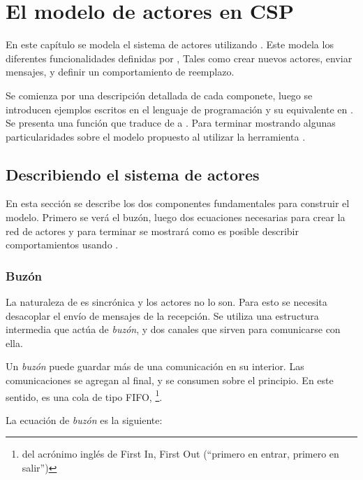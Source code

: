 \chapter{El modelo de actores en CSP}
En este capítulo se modela el sistema de actores utilizando \CSP. Este modela los diferentes funcionalidades definidas por \SAL, Tales como crear nuevos actores, enviar mensajes, y definir un comportamiento de reemplazo. 

Se comienza por una descripción detallada de cada componete, luego se introducen ejemplos escritos en el lenguaje de programación \SAL y su equivalente en \CSP. Se presenta una función que traduce de \SAL a \CSP. Para terminar mostrando algunas particularidades sobre el modelo propuesto al utilizar la herramienta \FDR.

\section{Describiendo el sistema de actores} 
En esta sección se describe los dos componentes fundamentales para construir el modelo. Primero se verá el buzón, luego dos ecuaciones necesarias para crear la red de actores y para terminar se mostrará como es posible describir comportamientos usando \CSP. 


\subsection{Buzón}\label{modelo:buzon}

La naturaleza de \CSP es sincrónica y los actores no lo son. Para esto se necesita desacoplar el envío de mensajes de la recepción. Se utiliza una estructura intermedia que actúa de \textit{buzón}, y dos canales que sirven para comunicarse con ella.

Un \textit{buzón} puede guardar más de una comunicación en su interior. Las comunicaciones se agregan al final, y se consumen sobre el principio. En este sentido, es una cola de tipo FIFO, \footnote{del acrónimo inglés de First In, First Out (``primero en entrar, primero en salir'')}.

La ecuación de \textit{buzón} es la siguiente:

